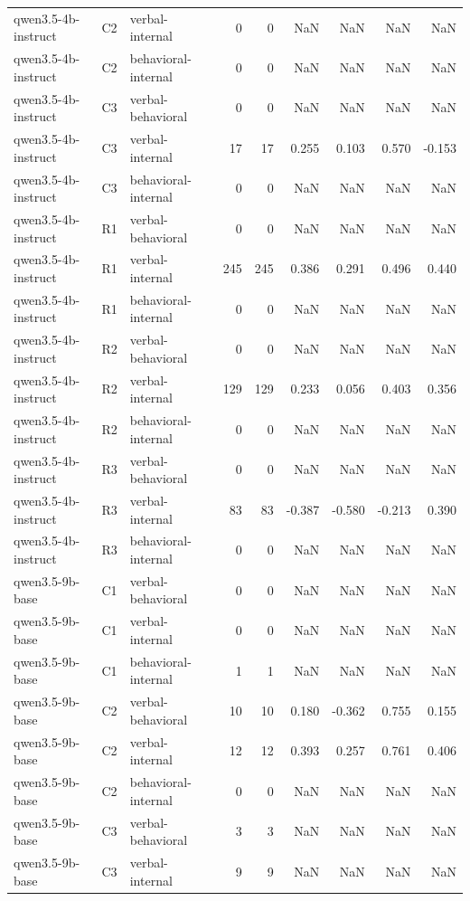 \begin{table}
\begin{tabular}{lllrrrrrr}
qwen3.5-4b-instruct & C2 & verbal-internal & 0 & 0 & NaN & NaN & NaN & NaN \\
qwen3.5-4b-instruct & C2 & behavioral-internal & 0 & 0 & NaN & NaN & NaN & NaN \\
qwen3.5-4b-instruct & C3 & verbal-behavioral & 0 & 0 & NaN & NaN & NaN & NaN \\
qwen3.5-4b-instruct & C3 & verbal-internal & 17 & 17 & 0.255 & 0.103 & 0.570 & -0.153 \\
qwen3.5-4b-instruct & C3 & behavioral-internal & 0 & 0 & NaN & NaN & NaN & NaN \\
qwen3.5-4b-instruct & R1 & verbal-behavioral & 0 & 0 & NaN & NaN & NaN & NaN \\
qwen3.5-4b-instruct & R1 & verbal-internal & 245 & 245 & 0.386 & 0.291 & 0.496 & 0.440 \\
qwen3.5-4b-instruct & R1 & behavioral-internal & 0 & 0 & NaN & NaN & NaN & NaN \\
qwen3.5-4b-instruct & R2 & verbal-behavioral & 0 & 0 & NaN & NaN & NaN & NaN \\
qwen3.5-4b-instruct & R2 & verbal-internal & 129 & 129 & 0.233 & 0.056 & 0.403 & 0.356 \\
qwen3.5-4b-instruct & R2 & behavioral-internal & 0 & 0 & NaN & NaN & NaN & NaN \\
qwen3.5-4b-instruct & R3 & verbal-behavioral & 0 & 0 & NaN & NaN & NaN & NaN \\
qwen3.5-4b-instruct & R3 & verbal-internal & 83 & 83 & -0.387 & -0.580 & -0.213 & 0.390 \\
qwen3.5-4b-instruct & R3 & behavioral-internal & 0 & 0 & NaN & NaN & NaN & NaN \\
qwen3.5-9b-base & C1 & verbal-behavioral & 0 & 0 & NaN & NaN & NaN & NaN \\
qwen3.5-9b-base & C1 & verbal-internal & 0 & 0 & NaN & NaN & NaN & NaN \\
qwen3.5-9b-base & C1 & behavioral-internal & 1 & 1 & NaN & NaN & NaN & NaN \\
qwen3.5-9b-base & C2 & verbal-behavioral & 10 & 10 & 0.180 & -0.362 & 0.755 & 0.155 \\
qwen3.5-9b-base & C2 & verbal-internal & 12 & 12 & 0.393 & 0.257 & 0.761 & 0.406 \\
qwen3.5-9b-base & C2 & behavioral-internal & 0 & 0 & NaN & NaN & NaN & NaN \\
qwen3.5-9b-base & C3 & verbal-behavioral & 3 & 3 & NaN & NaN & NaN & NaN \\
qwen3.5-9b-base & C3 & verbal-internal & 9 & 9 & NaN & NaN & NaN & NaN \\

\end{tabular}
\end{table}

